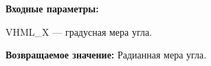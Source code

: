 \textbf{Входные параметры:}

 VHML\_X --- градусная мера угла.

\textbf{Возвращаемое значение:}
Радианная мера угла.